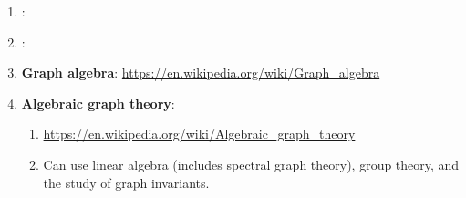 \begin{enumerate}
\begin{enumerate}
	\item : \url{}
	\item : \url{}
	\item {\bf Graph algebra}: \url{https://en.wikipedia.org/wiki/Graph_algebra}
	\item {\bf Algebraic graph theory}: \vspace{-0.2cm}
		\begin{enumerate} \itemsep -2pt
		\item \url{https://en.wikipedia.org/wiki/Algebraic_graph_theory}
		\item Can use linear algebra (includes spectral graph theory), group theory, and the study of graph invariants.
		\end{enumerate}
	\end{enumerate}
\end{enumerate}











